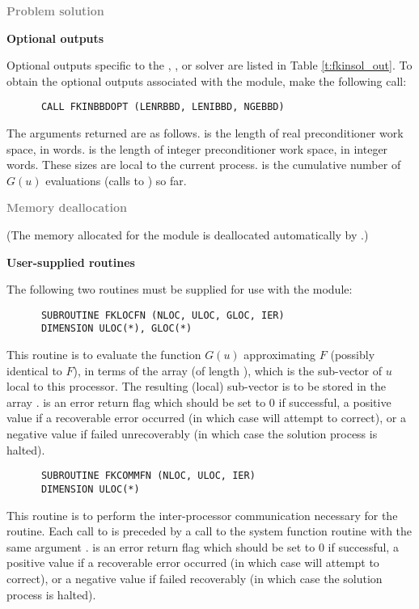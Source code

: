 \begin{Steps}
\item \textcolor{gray}{\bf Problem solution}

\item {\bf {\kinbbdpre} Optional outputs}

  Optional outputs specific to the {\spgmr}, {\spbcg}, or {\sptfqmr} solver are
  listed in Table \ref{t:fkinsol_out}.
  To obtain the optional outputs associated with the {\kinbbdpre} module, make
  the following call:
\begin{verbatim}
      CALL FKINBBDOPT (LENRBBD, LENIBBD, NGEBBD)
\end{verbatim}
  The arguments returned are as follows.
   is the length of real preconditioner work space, in 
  words.  is the length of integer preconditioner work space, in
  integer words. These sizes are local to the current process.
   is the cumulative number of $G(u)$ evaluations (calls to )
  so far.
  
\item \textcolor{gray}{\bf Memory deallocation}

  (The memory allocated for the {\fkinbbd} module is deallocated automatically
  by .)

\item {\bf User-supplied routines}

  The following two routines must be supplied for use with the {\kinbbdpre}
  module:
\begin{verbatim}
      SUBROUTINE FKLOCFN (NLOC, ULOC, GLOC, IER)
      DIMENSION ULOC(*), GLOC(*)
\end{verbatim}
  This routine is to evaluate the function $G(u)$ approximating $F$
  (possibly identical to $F$), in terms of the array
   (of length ), which is the sub-vector
  of $u$ local to this processor.  The resulting (local) sub-vector
  is to be stored in the array .
   is an error return flag which should be set to $0$ if successful,
  a positive value if a recoverable error occurred (in which case {\kinsol} will
  attempt to correct), or a negative value if  failed unrecoverably
  (in which case the solution process is halted).

\begin{verbatim}
      SUBROUTINE FKCOMMFN (NLOC, ULOC, IER)
      DIMENSION ULOC(*)
\end{verbatim}
  This routine is to perform the inter-processor communication necessary
  for the  routine.
  Each call to  is preceded by a call to the system function
  routine  with the same argument .
   is an error return flag which should be set to $0$ if successful,
  a positive value if a recoverable error occurred (in which case {\kinsol} will
  attempt to correct), or a negative value if  failed recoverably
  (in which case the solution process is halted).


\end{Steps}
